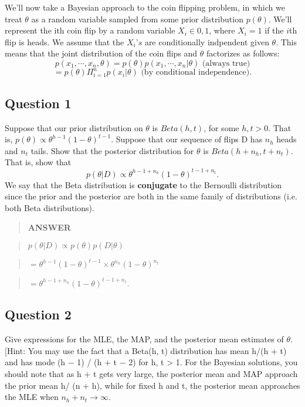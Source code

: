\documentclass[11pt]{article}
\begin{document}
We'll now take a Bayesian approach to the coin flipping problem, in
which we treat \(\theta\) as a random variable sampled from some prior
distribution \(p(\theta)\). We'll represent the ith coin flip by a
random variable \(X_i\in{0,1}\), where \(X_i=1\) if the \(i\)th flip is
heads. We assume that the \(X_i’s\) are conditionally indpendent given
\(\theta\). This means that the joint distribution of the coin flips and
\(\theta\) factorizes as follows:
\[p(x_1,\cdots, x_n,\theta) = p(\theta)p(x_1,\cdots, x_n|\theta) \text{ (always true)}\]
\[= p(\theta)\Pi_{i=1}^n p(x_i| θ) \text{ (by conditional independence)}.\]

    \subsection{Question 1}\label{question-1}

Suppose that our prior distribution on \(\theta\) is \(Beta(h, t)\), for
some \(h,t>0\). That is,
\(p(\theta)\propto\theta^{h−1}(1-\theta)^{t−1}\). Suppose that our
sequence of flips D has \(n_h\) heads and \(n_t\) tails. Show that the
posterior distribution for \(\theta\) is \(Beta(h+n_h,t+n_t)\). That is,
show that \[p(\theta|D)\propto\theta^{h−1+n_h}(1-\theta)^{t−1+n_t}.\] We
say that the Beta distribution is \textbf{conjugate} to the Bernoulli
distribution since the prior and the posterior are both in the same
family of distributions (i.e. both Beta distributions).

    \begin{quote}
\textbf{ANSWER}
\end{quote}

\begin{quote}
\(p(\theta|D)\propto p(\theta)p(D|\theta)\)
\end{quote}

\begin{quote}
\(=\theta^{h-1}(1-\theta)^{t-1}\times\theta^{n_h}(1-\theta)^{n_t}\)
\end{quote}

\begin{quote}
\(=\theta^{h-1+n_h}(1-\theta)^{t-1+n_t}.\)
\end{quote}

    \subsection{Question 2}\label{question-2}

Give expressions for the MLE, the MAP, and the posterior mean estimates
of \(\theta\). {[}Hint: You may use the fact that a Beta(h, t)
distribution has mean h/(h + t) and has mode (h − 1) / (h + t − 2) for
h, t \textgreater{} 1. For the Bayesian solutions, you should note that
as h + t gets very large, the posterior mean and MAP approach the prior
mean h/ (n + h), while for fixed h and t, the posterior mean approaches
the MLE when \(n_h+n_t\to\infty\).
\end{document}
